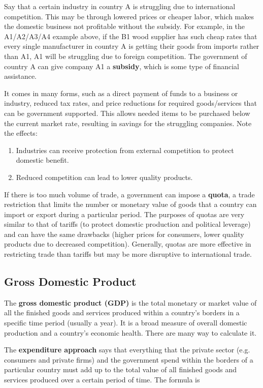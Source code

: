 \documentclass{article}
\begin{document}
    Say that a certain industry in country A is struggling due to international competition. This may be through lowered prices or cheaper labor, which makes the domestic business not profitable without the subsidy. For example, in the A1/A2/A3/A4 example above, if the B1 wood supplier has such cheap rates that every single manufacturer in country A is getting their goods from imports rather than A1, A1 will be struggling due to foreign competition. The government of country A can give company A1 a \textbf{subsidy}, which is some type of financial assistance.

    It comes in many forms, such as a direct payment of funds to a business or industry, reduced tax rates, and price reductions for required goods/services that can be government supported. This allows needed items to be purchased below the current market rate, resulting in savings for the struggling companies. Note the effects:

    \begin{enumerate}
      \item Industries can receive protection from external competition to protect domestic benefit.
      \item Reduced competition can lead to lower quality products.
    \end{enumerate}
    If there is too much volume of trade, a government can impose a \textbf{quota}, a trade restriction that limits the number or monetary value of goods that a country can import or export during a particular period. The purposes of quotas are very similar to that of tariffs (to protect domestic production and political leverage) and can have the same drawbacks (higher prices for consumers, lower quality products due to decreased competition). Generally, quotas are more effective in restricting trade than tariffs but may be more disruptive to international trade.

  \subsection{Gross Domestic Product}

    The \textbf{gross domestic product (GDP)} is the total monetary or market value of all the finished goods and services produced within a country's borders in a specific time period (usually a year). It is a broad measure of overall domestic production and a country's economic health. There are many way to calculate it.

    The \textbf{expenditure approach} says that everything that the private sector (e.g. consumers and private firms) and the government spend within the borders of a particular country must add up to the total value of all finished goods and services produced over a certain period of time. The formula is
\end{document}
